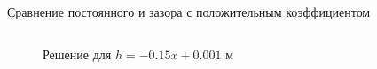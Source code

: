 \documentclass[ignoreonframetext,unicode]{beamer}
\begin{document}
\begin{frame}{Сравнение постоянного и зазора с положительным коэффициентом}
\begin{columns}
	\begin{figure}[!htbp]
		\caption{Решение для $h = -0.15 x + 0.001$ м}
		\label{res_static}
	\end{figure}
		
	\end{columns}

	
\end{frame}
\end{document}
